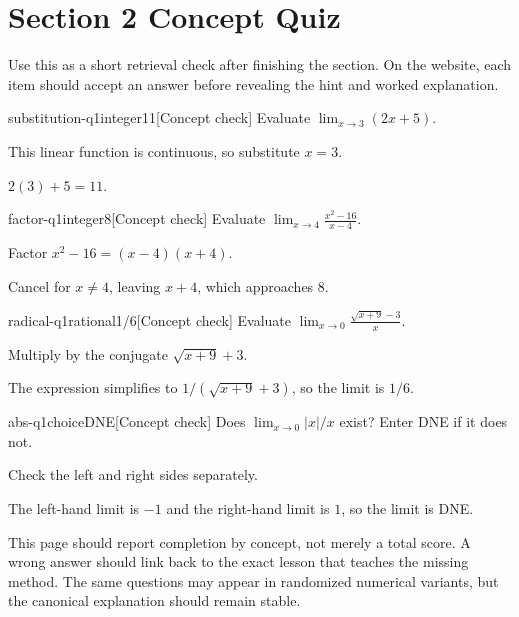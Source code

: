 \section*{Section 2 Concept Quiz}

Use this as a short retrieval check after finishing the section. On the website, each item should accept an answer before revealing the hint and worked explanation.

\begin{bgcheck}{substitution-q1}{integer}{11}[Concept check]
Evaluate \(\lim_{x\to3}(2x+5)\).
\begin{bghint}
This linear function is continuous, so substitute \(x=3\).
\end{bghint}
\begin{bgreveal}
\(2(3)+5=11\).
\end{bgreveal}
\end{bgcheck}

\begin{bgcheck}{factor-q1}{integer}{8}[Concept check]
Evaluate \(\lim_{x\to4}\frac{x^2-16}{x-4}\).
\begin{bghint}
Factor \(x^2-16=(x-4)(x+4)\).
\end{bghint}
\begin{bgreveal}
Cancel for \(x\ne4\), leaving \(x+4\), which approaches \(8\).
\end{bgreveal}
\end{bgcheck}

\begin{bgcheck}{radical-q1}{rational}{1/6}[Concept check]
Evaluate \(\lim_{x\to0}\frac{\sqrt{x+9}-3}{x}\).
\begin{bghint}
Multiply by the conjugate \(\sqrt{x+9}+3\).
\end{bghint}
\begin{bgreveal}
The expression simplifies to \(1/(\sqrt{x+9}+3)\), so the limit is \(1/6\).
\end{bgreveal}
\end{bgcheck}

\begin{bgcheck}{abs-q1}{choice}{DNE}[Concept check]
Does \(\lim_{x\to0}|x|/x\) exist? Enter DNE if it does not.
\begin{bghint}
Check the left and right sides separately.
\end{bghint}
\begin{bgreveal}
The left-hand limit is \(-1\) and the right-hand limit is \(1\), so the limit is DNE.
\end{bgreveal}
\end{bgcheck}

\begin{bgsummary}[title={Quiz use on the website}]
This page should report completion by concept, not merely a total score. A wrong answer should link back to the exact lesson that teaches the missing method. The same questions may appear in randomized numerical variants, but the canonical explanation should remain stable.
\end{bgsummary}
